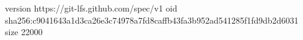 version https://git-lfs.github.com/spec/v1
oid sha256:c9041643a1d3ca26e3c74978a7fd8caffb43fa3b952ad541285f1fd9db2d6031
size 22000
